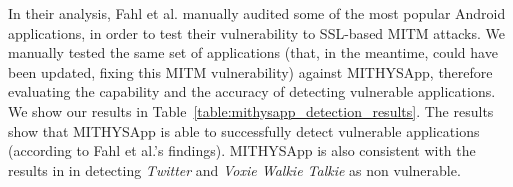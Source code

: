 \documentclass[english]{llncs}
\begin{document}
In their analysis, Fahl et al. \cite{Fahl:2012:WEM:2382196.2382205} manually audited some of the most popular Android applications, in order to test their vulnerability to SSL-based MITM attacks. We manually tested the same set of applications (that, in the meantime, could have been updated, fixing this MITM vulnerability) against MITHYSApp, therefore evaluating the capability and the accuracy of detecting vulnerable applications. We show our results in Table~\ref{table:mithysapp_detection_results}. The results show that MITHYSApp is able to successfully detect vulnerable applications (according to Fahl et al.'s findings). MITHYSApp is also consistent with the results in \cite{Fahl:2012:WEM:2382196.2382205} in detecting \textit{Twitter} and \textit{Voxie Walkie Talkie} as non vulnerable.

\vspace{-0.2cm}
\begin{table}[!h]
\centering
	\vspace{3mm}
	\caption{MITHYSApp results in detecting apps safe from SSL-based MITM attacks. (\checkmark) indicates that the app is safe; () means that the app is vulnerable.}
	\label{table:mithysapp_detection_results}
\end{table}
\end{document}
